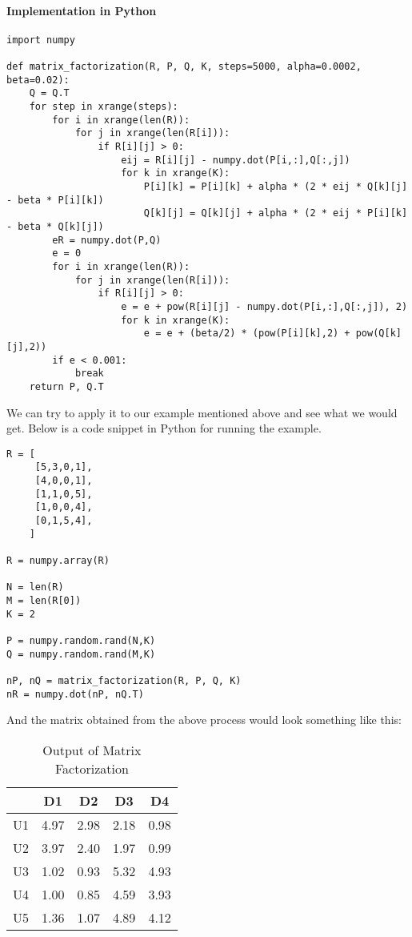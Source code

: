 \paragraph{Implementation in Python}
\begin{lstlisting}
import numpy

def matrix_factorization(R, P, Q, K, steps=5000, alpha=0.0002, beta=0.02):
    Q = Q.T
    for step in xrange(steps):
        for i in xrange(len(R)):
            for j in xrange(len(R[i])):
                if R[i][j] > 0:
                    eij = R[i][j] - numpy.dot(P[i,:],Q[:,j])
                    for k in xrange(K):
                        P[i][k] = P[i][k] + alpha * (2 * eij * Q[k][j] - beta * P[i][k])
                        Q[k][j] = Q[k][j] + alpha * (2 * eij * P[i][k] - beta * Q[k][j])
        eR = numpy.dot(P,Q)
        e = 0
        for i in xrange(len(R)):
            for j in xrange(len(R[i])):
                if R[i][j] > 0:
                    e = e + pow(R[i][j] - numpy.dot(P[i,:],Q[:,j]), 2)
                    for k in xrange(K):
                        e = e + (beta/2) * (pow(P[i][k],2) + pow(Q[k][j],2))
        if e < 0.001:
            break
    return P, Q.T
\end{lstlisting}

 We can try to apply it to our example mentioned above and see what we would get. Below is a code snippet in Python for running the example.
\begin{lstlisting}
R = [
     [5,3,0,1],
     [4,0,0,1],
     [1,1,0,5],
     [1,0,0,4],
     [0,1,5,4],
    ]

R = numpy.array(R)

N = len(R)
M = len(R[0])
K = 2

P = numpy.random.rand(N,K)
Q = numpy.random.rand(M,K)

nP, nQ = matrix_factorization(R, P, Q, K)
nR = numpy.dot(nP, nQ.T)
\end{lstlisting}

 And the matrix obtained from the above process would look something like this:
\begin{table}[ht]
\caption{Output of Matrix Factorization}
\centering %
\begin{tabular}{c c c c c}
\hline\hline %
& D1 & D2 & D3 & D4 \\ [0.5ex] %
\hline %
U1 & 4.97 & 2.98 & 2.18 & 0.98\\ %
U2 & 3.97 & 2.40 & 1.97 & 0.99\\
U3 & 1.02 & 0.93 & 5.32 & 4.93\\
U4 & 1.00 & 0.85 & 4.59 & 3.93\\
U5 & 1.36 & 1.07 & 4.89 & 4.12\\ [1ex] %
\hline %
\end{tabular}
\end{table}

